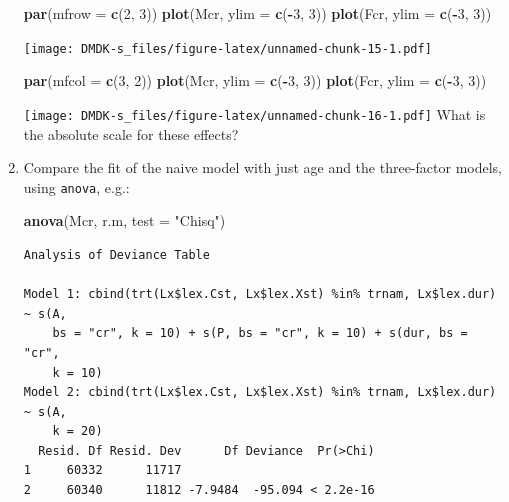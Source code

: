 \documentclass[
]{book}
\newenvironment{Shaded}{\begin{snugshade}}{\end{snugshade}}
\newcommand{\AttributeTok}[1]{\textcolor[rgb]{0.13,0.29,0.53}{#1}}
\newcommand{\DecValTok}[1]{\textcolor[rgb]{0.00,0.00,0.81}{#1}}
\newcommand{\FunctionTok}[1]{\textcolor[rgb]{0.13,0.29,0.53}{\textbf{#1}}}
\newcommand{\NormalTok}[1]{#1}
\newcommand{\SpecialCharTok}[1]{\textcolor[rgb]{0.81,0.36,0.00}{\textbf{#1}}}
\newcommand{\StringTok}[1]{\textcolor[rgb]{0.31,0.60,0.02}{#1}}
\begin{document}
\begin{enumerate}
\begin{Shaded}
\begin{Highlighting}[]
\FunctionTok{par}\NormalTok{(}\AttributeTok{mfrow =} \FunctionTok{c}\NormalTok{(}\DecValTok{2}\NormalTok{, }\DecValTok{3}\NormalTok{))}
\FunctionTok{plot}\NormalTok{(Mcr, }\AttributeTok{ylim =} \FunctionTok{c}\NormalTok{(}\SpecialCharTok{{-}}\DecValTok{3}\NormalTok{, }\DecValTok{3}\NormalTok{))}
\FunctionTok{plot}\NormalTok{(Fcr, }\AttributeTok{ylim =} \FunctionTok{c}\NormalTok{(}\SpecialCharTok{{-}}\DecValTok{3}\NormalTok{, }\DecValTok{3}\NormalTok{))}
\end{Highlighting}
\end{Shaded}

  \texttt{[image: DMDK-s\_files/figure-latex/unnamed-chunk-15-1.pdf]}

\begin{Shaded}
\begin{Highlighting}[]
\FunctionTok{par}\NormalTok{(}\AttributeTok{mfcol =} \FunctionTok{c}\NormalTok{(}\DecValTok{3}\NormalTok{, }\DecValTok{2}\NormalTok{))}
\FunctionTok{plot}\NormalTok{(Mcr, }\AttributeTok{ylim =} \FunctionTok{c}\NormalTok{(}\SpecialCharTok{{-}}\DecValTok{3}\NormalTok{, }\DecValTok{3}\NormalTok{))}
\FunctionTok{plot}\NormalTok{(Fcr, }\AttributeTok{ylim =} \FunctionTok{c}\NormalTok{(}\SpecialCharTok{{-}}\DecValTok{3}\NormalTok{, }\DecValTok{3}\NormalTok{))}
\end{Highlighting}
\end{Shaded}

  \texttt{[image: DMDK-s\_files/figure-latex/unnamed-chunk-16-1.pdf]}
  What is the absolute scale for these effects?
\item
  Compare the fit of the naive model with just age and the
  three-factor models, using \texttt{anova}, e.g.:

\begin{Shaded}
\begin{Highlighting}[]
\FunctionTok{anova}\NormalTok{(Mcr, r.m, }\AttributeTok{test =} \StringTok{"Chisq"}\NormalTok{)}
\end{Highlighting}
\end{Shaded}

\begin{verbatim}
Analysis of Deviance Table

Model 1: cbind(trt(Lx$lex.Cst, Lx$lex.Xst) %in% trnam, Lx$lex.dur) ~ s(A, 
    bs = "cr", k = 10) + s(P, bs = "cr", k = 10) + s(dur, bs = "cr", 
    k = 10)
Model 2: cbind(trt(Lx$lex.Cst, Lx$lex.Xst) %in% trnam, Lx$lex.dur) ~ s(A, 
    k = 20)
  Resid. Df Resid. Dev      Df Deviance  Pr(>Chi)
1     60332      11717                           
2     60340      11812 -7.9484  -95.094 < 2.2e-16
\end{verbatim}


\end{enumerate}
\end{document}
